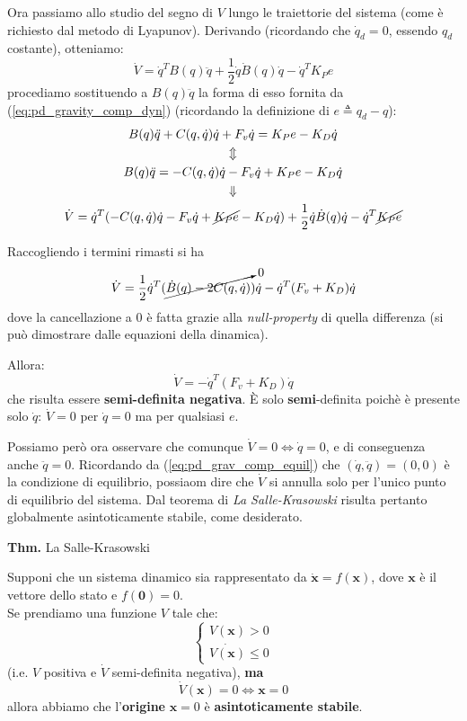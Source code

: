Ora passiamo allo studio del segno di $V$ lungo le traiettorie del sistema (come è richiesto dal metodo di Lyapunov). Derivando (ricordando che $\dot{q}_d = 0$, essendo $q_d$ costante), otteniamo:
$$
\dot{V} = \dot{q}^TB(q)\ddot{q} + \frac{1}{2}\dot{q}\dot{B}(q)\dot{q} - \dot{q}^TK_Pe
$$
procediamo sostituendo a $B(q)\ddot{q}$ la forma di esso fornita da (\ref{eq:pd_gravity_comp_dyn}) (ricordando la definizione di $e \triangleq q_d - q$):
\begin{gather*}
	B(q)\ddot{q} + C(q, \dot{q})\dot{q} + F_v\dot{q} = K_Pe - K_D\dot{q} \\
	\Updownarrow \\
	B(q)\ddot{q} = -C(q, \dot{q})\dot{q} - F_v\dot{q} + K_Pe - K_D\dot{q} \\
	\Downarrow \\
	\dot{V} = \dot{q}^T( -C(q, \dot{q})\dot{q} - F_v\dot{q} + \cancel{K_Pe} - K_D\dot{q} ) + \frac{1}{2}\dot{q}\dot{B}(q)\dot{q} - \dot{q}^T \cancel{K_Pe}
\end{gather*}

Raccogliendo i termini rimasti si ha
$$
\dot{V} = \frac{1}{2} \dot{q}^T ( \cancelto{0}{ \dot{B}(q) - 2C(q, \dot{q}) })\dot{q} - \dot{q}^T (F_v + K_D)\dot{q}
$$
dove la cancellazione a 0 è fatta grazie alla \textit{null-property} di quella differenza (si può dimostrare dalle equazioni della dinamica).

Allora:
$$
\dot{V} = - \dot{q}^T (F_v + K_D)\dot{q}
$$
che risulta essere \textbf{semi-definita negativa}. È solo \textbf{semi}-definita poichè è presente solo $\dot{q}$: $\dot{V} = 0$ per $\dot{q} = 0$ ma per qualsiasi $e$.

Possiamo però ora osservare che comunque $\dot{V} = 0 \iff \dot{q} = 0$, e di conseguenza anche $\ddot{q} = 0$. Ricordando da (\ref{eq:pd_grav_comp_equil}) che $(\dot{q}, \ddot{q}) = (0,0)$ è la condizione di equilibrio, possiaom dire che $\dot{V}$ si annulla solo per l'unico punto di equilibrio del sistema.
Dal teorema di \textit{La Salle-Krasowski} risulta pertanto globalmente asintoticamente stabile, come desiderato.
\unboldmath

\vspace{15pt}
\begin{addendum}
\textbf{Thm.} La Salle-Krasowski

Supponi che un sistema dinamico sia rappresentato da $\dot{\mathbf{x}}=f(\mathbf{x})$, dove $\mathbf{x}$ è il vettore dello stato e $f(\mathbf{0})=0$.\\
Se prendiamo una funzione $V$ tale che:
$$
\begin{cases}
	V(\mathbf{x}) > 0 \\
	\dot{V(\mathbf{x})} \leq 0
\end{cases}
$$
(i.e. $V$ positiva e $\dot{V}$ semi-definita negativa), \textbf{ma}
$$
\dot{V}(\mathbf{x}) = 0 \iff \mathbf{x} = 0
$$
allora abbiamo che l'\textbf{origine} $\mathbf{x} = 0$ è \textbf{asintoticamente stabile}.
\end{addendum}










